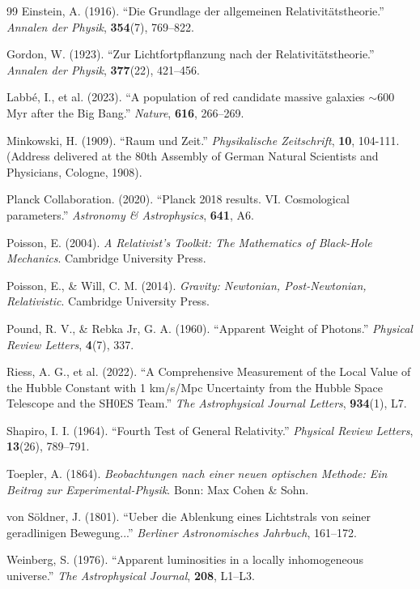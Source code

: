 \documentclass[11pt]{article}
\begin{document}
\begin{thebibliography}{99}
Einstein, A. (1916).
``Die Grundlage der allgemeinen Relativit\"atstheorie.''
\textit{Annalen der Physik}, \textbf{354}(7), 769--822.

Gordon, W. (1923).
``Zur Lichtfortpflanzung nach der Relativit\"atstheorie.''
\textit{Annalen der Physik}, \textbf{377}(22), 421--456.

Labb\'e, I., et al. (2023).
``A population of red candidate massive galaxies $\sim$600 Myr after the Big Bang.''
\textit{Nature}, \textbf{616}, 266--269.

Minkowski, H. (1909). 
``Raum und Zeit.'' \textit{Physikalische Zeitschrift}, \textbf{10}, 104-111. 
(Address delivered at the 80th Assembly of German Natural Scientists and Physicians, Cologne, 1908).

Planck Collaboration. (2020).
``Planck 2018 results. VI. Cosmological parameters.''
\textit{Astronomy \& Astrophysics}, \textbf{641}, A6.

Poisson, E. (2004). 
\textit{A Relativist's Toolkit: The Mathematics of Black-Hole Mechanics}. 
Cambridge University Press.

Poisson, E., \& Will, C. M. (2014). 
\textit{Gravity: Newtonian, Post-Newtonian, Relativistic}. 
Cambridge University Press.

Pound, R. V., \& Rebka Jr, G. A. (1960). 
``Apparent Weight of Photons.''
\textit{Physical Review Letters}, \textbf{4}(7), 337.

Riess, A. G., et al. (2022).
``A Comprehensive Measurement of the Local Value of the Hubble Constant with 1 km/s/Mpc Uncertainty from the Hubble Space Telescope and the SH0ES Team.''
\textit{The Astrophysical Journal Letters}, \textbf{934}(1), L7.

Shapiro, I. I. (1964).
``Fourth Test of General Relativity.''
\textit{Physical Review Letters}, \textbf{13}(26), 789--791.

Toepler, A. (1864). \textit{Beobachtungen nach einer neuen optischen Methode: Ein Beitrag zur Experimental-Physik}. Bonn: Max Cohen \& Sohn.

von S\"oldner, J. (1801).
``Ueber die Ablenkung eines Lichtstrals von seiner geradlinigen Bewegung...''
\textit{Berliner Astronomisches Jahrbuch}, 161--172.

Weinberg, S. (1976).
``Apparent luminosities in a locally inhomogeneous universe.''
\textit{The Astrophysical Journal}, \textbf{208}, L1--L3.

\end{thebibliography}
\end{document}
